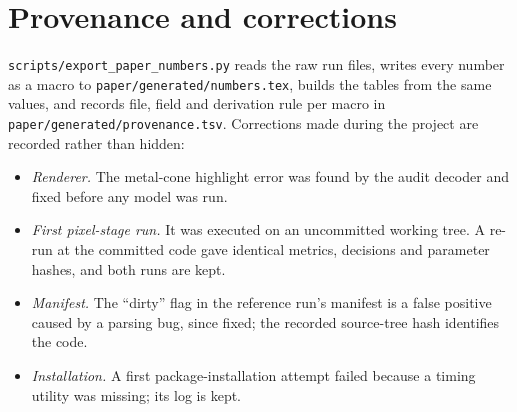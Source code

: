 \section{Provenance and corrections}
\label{app:provenance}

\texttt{scripts/export\_paper\_numbers.py} reads the raw run files, writes every number as a macro
to \texttt{paper/generated/numbers.tex}, builds the tables from the same values, and records file,
field and derivation rule per macro in \texttt{paper/generated/provenance.tsv}. Corrections made
during the project are recorded rather than hidden:
\begin{itemize}
\item \emph{Renderer.} The metal-cone highlight error was found by the audit decoder and fixed
before any model was run.
\item \emph{First pixel-stage run.} It was executed on an uncommitted working tree. A re-run at the
committed code gave identical metrics, decisions and parameter hashes, and both runs are kept.
\item \emph{Manifest.} The ``dirty'' flag in the reference run's manifest is a false positive
caused by a parsing bug, since fixed; the recorded source-tree hash identifies the code.
\item \emph{Installation.} A first package-installation attempt failed because a timing utility
was missing; its log is kept.
\end{itemize}
